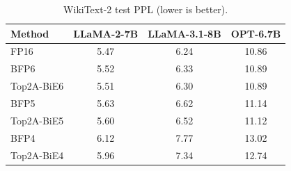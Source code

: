 \begin{table}[t]
    \centering
    \caption{WikiText-2 test PPL (lower is better).}
    \label{tab:ppl_bfp_top2abie_4to6}
    \vspace{0.7em}
    \begin{tabular}{lccc}
        \toprule
        Method & LLaMA-2-7B & LLaMA-3.1-8B & OPT-6.7B \\
        \midrule
        FP16        & 5.47 & 6.24 & 10.86 \\
        \midrule
        BFP6        & 5.52 & 6.33 & 10.89 \\
        Top2A-BiE6  & 5.51 & 6.30 & 10.89 \\
        \addlinespace
        BFP5        & 5.63 & 6.62 & 11.14 \\
        Top2A-BiE5  & 5.60 & 6.52 & 11.12 \\
        \addlinespace
        BFP4        & 6.12 & 7.77 & 13.02 \\
        Top2A-BiE4  & 5.96 & 7.34 & 12.74 \\
        \bottomrule
    \end{tabular}
\end{table}
